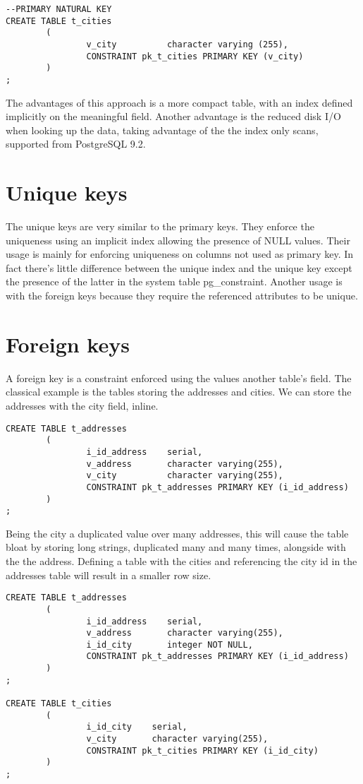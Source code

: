 \begin{lstlisting}[style=pgsql]
--PRIMARY NATURAL KEY 
CREATE TABLE t_cities
        (
                v_city          character varying (255),
                CONSTRAINT pk_t_cities PRIMARY KEY (v_city)
        )
;
\end{lstlisting}

The advantages of this approach is a more compact table, with an index defined implicitly on the 
meaningful field. Another advantage is the reduced disk I/O when looking up the data, taking 
advantage of the the index only scans, supported from PostgreSQL 9.2.


\section{Unique keys}
The unique keys are very similar to the primary keys. They enforce the uniqueness using an implicit 
index allowing the presence of NULL values. Their usage is mainly for enforcing uniqueness on 
columns not used as primary key. In fact there's little difference between the unique index and the 
unique key except the presence of the latter in the system table pg\_constraint. Another usage 
is with the foreign keys because they require the referenced attributes to be unique. 
\newpage

\section{Foreign keys}
\label{sec:FKEYS}
A foreign key is a constraint enforced using the values another table's field. The classical 
example is the tables storing the addresses  and cities. We can store the addresses with the city 
field, inline.

\begin{lstlisting}[style=pgsql]
CREATE TABLE t_addresses
        (
                i_id_address    serial,
                v_address       character varying(255),
                v_city          character varying(255),
                CONSTRAINT pk_t_addresses PRIMARY KEY (i_id_address)
        )
;
\end{lstlisting}

Being the city a duplicated value over many addresses, this will cause the table bloat by storing 
long strings, duplicated many and many times, alongside with the the address. Defining a table with 
the cities and referencing the city id in the addresses table will result in a smaller row size. 

\begin{lstlisting}[style=pgsql]
CREATE TABLE t_addresses
        (
                i_id_address    serial,
                v_address       character varying(255),
                i_id_city       integer NOT NULL,
                CONSTRAINT pk_t_addresses PRIMARY KEY (i_id_address)
        )
;

CREATE TABLE t_cities
        (
                i_id_city    serial,
                v_city       character varying(255),
                CONSTRAINT pk_t_cities PRIMARY KEY (i_id_city)
        )
;

\end{lstlisting}

